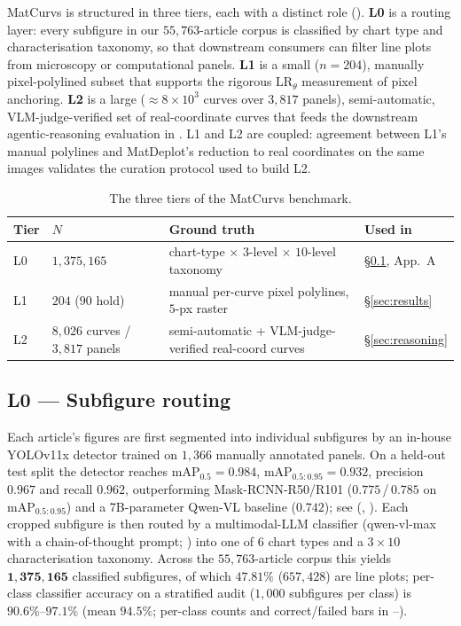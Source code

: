 \documentclass{article}
\begin{document}
MatCurvs is structured in three tiers, each with a distinct role
(). \textbf{L0} is a routing layer: every subfigure
in our $55{,}763$-article corpus is classified by chart type and
characterisation taxonomy, so that downstream consumers can filter
line plots from microscopy or computational panels. \textbf{L1} is a
small ($n{=}204$), manually pixel-polylined subset that supports the
rigorous $\mathrm{LR}_{\theta}$ measurement of pixel anchoring.
\textbf{L2} is a large ($\approx 8{\times}10^{3}$ curves over
$3{,}817$ panels), semi-automatic, VLM-judge-verified set of
real-coordinate curves that feeds the downstream agentic-reasoning
evaluation in . L1 and L2 are coupled: agreement
between L1's manual polylines and MatDeplot's reduction to real
coordinates on the same images validates the curation protocol used
to build L2.

\begin{table}[t]
\centering\small
\caption{The three tiers of the MatCurvs benchmark.}
\label{tab:tiers}
\begin{tabular}{llll}
\toprule
Tier & $N$ & Ground truth & Used in \\
\midrule
L0 & $1{,}375{,}165$ & chart-type $\times$ $3$-level $\times$ $10$-level taxonomy & \S\ref{ssec:l0}, App.~A \\
L1 & $204$ ($90$ hold) & manual per-curve pixel polylines, $5$-px raster & \S\ref{sec:results} \\
L2 & $8{,}026$ curves / $3{,}817$ panels & semi-automatic + VLM-judge-verified real-coord curves & \S\ref{sec:reasoning} \\
\bottomrule
\end{tabular}
\end{table}

\subsection{L0 --- Subfigure routing}\label{ssec:l0}
Each article's figures are first segmented into individual
subfigures by an in-house YOLOv11x detector trained on $1{,}366$
manually annotated panels. On a held-out test split the detector
reaches mAP$_{0.5}{=}0.984$, mAP$_{0.5:0.95}{=}0.932$,
precision $0.967$ and recall $0.962$, outperforming Mask-RCNN-R50/R101
($0.775$\,/\,$0.785$ on mAP$_{0.5:0.95}$) and a 7B-parameter Qwen-VL
baseline ($0.742$); see  (,
). Each cropped subfigure is then routed by a
multimodal-LLM classifier (qwen-vl-max with a chain-of-thought
prompt; ) into one of $6$ chart types
and a $3{\times}10$ characterisation taxonomy. Across the
$55{,}763$-article corpus this yields $\mathbf{1{,}375{,}165}$
classified subfigures, of which $\mathbf{47.81\%}$ ($657{,}428$) are
line plots; per-class classifier accuracy on a stratified audit
($1{,}000$ subfigures per class) is $90.6\%\text{--}97.1\%$ (mean
$94.5\%$; per-class counts and correct/failed bars in
--).
\end{document}
